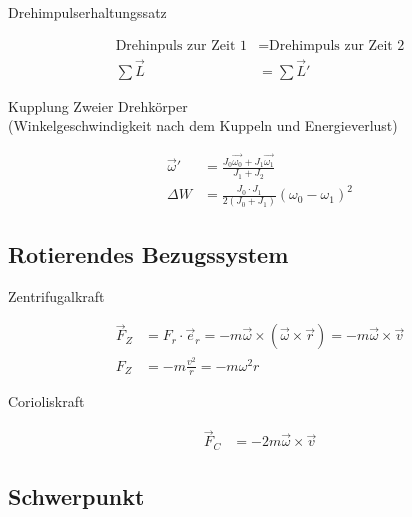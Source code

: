 \begin{boxleft}Drehimpulserhaltungssatz
\end{boxleft}\begin{boxrightshaded}
\begin{align}
\text{Drehinpuls zur Zeit 1} &= \text{Drehimpuls zur Zeit 2}\\
\sum \vec{L}&=\sum \vec{L}'
\end{align}
\end{boxrightshaded}

\begin{boxleft}Kupplung Zweier Drehkörper\\
(Winkelgeschwindigkeit nach dem Kuppeln und Energieverlust)
\end{boxleft}\begin{boxrightshaded}
\begin{align}
\vec{\omega}'&=\frac{J_0\vec{\omega_0}+J_1\vec{\omega_1}}{J_1+J_2}\\
\Delta W&=\frac{J_0\cdot J_1}{2\left(J_0+J_1\right)}\left(\omega_0-\omega_1\right)^2
\end{align}
\end{boxrightshaded}


\subsection{Rotierendes Bezugssystem}

\begin{boxleft}Zentrifugalkraft
\end{boxleft}\begin{boxrightshaded}
\begin{align}
\vec{F}_Z&=F_r\cdot \vec{e}_r=-m\vec{\omega}\times\left(\vec{\omega}\times\vec{r}\right)=-m\vec{\omega}\times\vec{v}\\
  F_Z&=-m\frac{v^2}{r}=-m\omega^2 r
\end{align}
\end{boxrightshaded}

\begin{boxleft}Corioliskraft
\end{boxleft}\begin{boxrightshaded}
\begin{align}
\vec{F}_C&=-2m\vec{\omega}\times\vec{v}
\end{align}
\end{boxrightshaded}

\subsection{Schwerpunkt}

